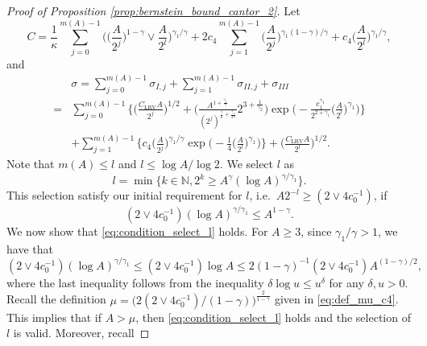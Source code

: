 \documentclass[11pt]{article}
\theoremstyle{plain}
\theoremstyle{definition}
\begin{document}
\begin{proof}[Proof of Proposition \ref{prop:bernstein_bound_cantor_2}]
Let 
\begin{equation*}
    C = \frac{1}{\kappa}\sum_{j = 0}^{m(A)-1}\Big(\Big(\frac{A}{2^j}\Big)^{1-\gamma} \vee \frac{A}{2^l}\Big)^{\gamma_1/\gamma} + 2c_4\sum_{j = 1}^{m(A)-1}\Big(\frac{A}{2^j}\Big)^{\gamma_1(1-\gamma)/\gamma} + c_4\Big( \frac{A}{2^l}\Big)^{\gamma_1/\gamma},
\end{equation*}
and
\begin{equation*}
\begin{aligned}
    &\sigma = \sum_{j = 0}^{m(A)-1}\sigma_{I,j} + \sum_{j = 1}^{m(A)-1}\sigma_{II,j} + \sigma_{III}\\
    =& \sum_{j = 0}^{m(A)-1}\bigg\{\bigg(\frac{C_{\mathrm{LRV}}A}{2^{j}}\bigg)^{1/2} +  \bigg(\frac{A^{1+\frac{\gamma_1}{\gamma}}}{(2^j)^{\frac{\gamma}{2}+\frac{\gamma_1}{2\gamma}}}2^{3+\frac{1}{\gamma_2}}\bigg) \exp\bigg(-\frac{c_1^{\gamma_1}}{2^{2+\gamma_1}}\bigg(\frac{A}{2^l}\bigg)^{\gamma_1}\bigg)\bigg\}\\
    &+ \sum_{j = 1}^{m(A)-1}\bigg\{c_4\bigg(\frac{A}{2^j}\bigg)^{\gamma_1/\gamma}\exp\bigg(-\frac{1}{4}\bigg(\frac{A}{2^l}\bigg)^{\gamma_1}\bigg)\bigg\} + \bigg(\frac{C_{\mathrm{LRV}}A}{2^l}\bigg)^{1/2}.
\end{aligned}
\end{equation*}
Note that $m(A) \leq l$ and $l \leq \log A/\log 2$. We select $l$ as
\begin{equation}\label{eq:select_l}
    l = \min\{k \in \mathbb{N}, 2^k \geq A^{\gamma}(\log A)^{\gamma/\gamma_1}\}.
\end{equation}
This selection satisfy our initial requirement for $l$, i.e.~$A2^{-l} \geq (2 \vee 4c_0^{-1})$, if
\begin{equation}\label{eq:condition_select_l}
    (2 \vee 4c_0^{-1})(\log A)^{\gamma/\gamma_1} \leq A^{1-\gamma}.
\end{equation}
We now show that \eqref{eq:condition_select_l} holds. For $A \geq 3$, since $\gamma_1/\gamma > 1$, we have that
\begin{equation*}
    (2 \vee 4c_0^{-1})(\log A)^{\gamma/\gamma_1} \leq (2 \vee 4c_0^{-1})\log A \leq 2(1-\gamma)^{-1}(2 \vee 4c_0^{-1})A^{(1-\gamma)/2},
\end{equation*}
where the last inequality follows from the inequality $\delta\log u \leq u^{\delta}$ for any $\delta, u > 0$. Recall the definition  
$\mu = \big(2(2 \vee 4c_0^{-1})/(1-\gamma)\big)^{\frac{2}{1-\gamma}}$ given in \eqref{eq:def_mu_c4}.
This implies that if $A > \mu$, then \eqref{eq:condition_select_l} holds and the selection of $l$ is valid. Moreover, recall

\end{proof}
\end{document}

